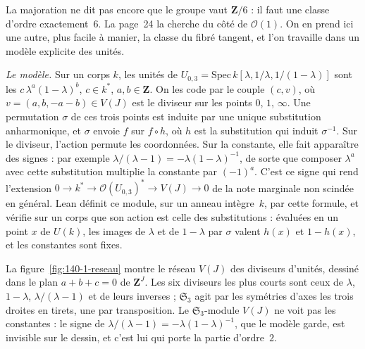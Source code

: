 La majoration ne dit pas encore que le groupe vaut $\mathbf Z/6$ : il faut une classe d'ordre exactement~$6$. La page~24 la cherche du côté de $\mathcal O(1)$. On en prend ici une autre, plus facile à manier, la classe du fibré tangent, et l'on travaille dans un modèle explicite des unités.

\noindent\emph{Le modèle.} Sur un corps $k$, les unités de $U_{0,3} = \mathrm{Spec}\, k[\lambda, 1/\lambda, 1/(1-\lambda)]$ sont les $c\,\lambda^a(1-\lambda)^b$, $c \in k^*$, $a, b \in \mathbf Z$. On les code par le couple $(c, v)$, où $v = (a, b, -a-b) \in V(J)$ est le diviseur sur les points $0$, $1$, $\infty$. Une permutation $\sigma$ de ces trois points est induite par une unique substitution anharmonique, et $\sigma$ envoie $f$ sur $f \circ h$, où $h$ est la substitution qui induit $\sigma^{-1}$. Sur le diviseur, l'action permute les coordonnées. Sur la constante, elle fait apparaître des signes : par exemple $\lambda/(\lambda - 1) = -\lambda(1-\lambda)^{-1}$, de sorte que composer $\lambda^a$ avec cette substitution multiplie la constante par $(-1)^a$. C'est ce signe qui rend l'extension $0 \to k^* \to \mathcal O(U_{0,3})^* \to V(J) \to 0$ de la note marginale non scindée en général. Lean définit ce module, sur un anneau intègre~$k$, par cette formule, et vérifie sur un corps que son action est celle des substitutions : évaluées en un point $x$ de $U(k)$, les images de $\lambda$ et de $1 - \lambda$ par $\sigma$ valent $h(x)$ et $1 - h(x)$, et les constantes sont fixes.

La figure~\ref{fig:140-1-reseau} montre le réseau $V(J)$ des diviseurs d'unités, dessiné dans le plan $a + b + c = 0$ de $\mathbf Z^J$. Les six diviseurs les plus courts sont ceux de $\lambda$, $1 - \lambda$, $\lambda/(\lambda - 1)$ et de leurs inverses ; $\mathfrak S_3$ agit par les symétries d'axes les trois droites en tirets, une par transposition. Le $\mathfrak S_3$-module $V(J)$ ne voit pas les constantes : le signe de $\lambda/(\lambda - 1) = -\lambda(1 - \lambda)^{-1}$, que le modèle garde, est invisible sur le dessin, et c'est lui qui porte la partie d'ordre~$2$.

